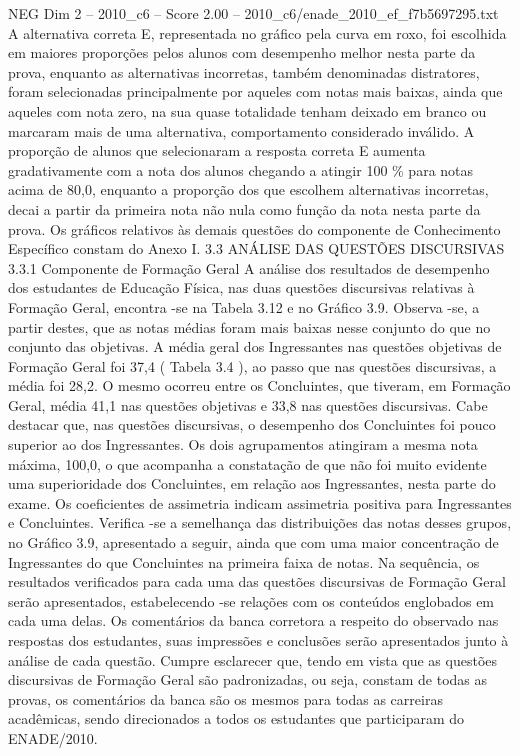 \begin{textsample}{NEG Dim 2 – 2010\_c6 – Score 2.00 – 2010\_c6/enade\_2010\_ef\_f7b5697295.txt}
A alternativa correta E, representada no gráfico pela curva em roxo, foi escolhida em maiores proporções pelos alunos com desempenho melhor nesta parte da prova, enquanto as alternativas incorretas, também denominadas distratores, foram selecionadas principalmente por aqueles com notas mais baixas, ainda que aqueles com nota zero, na sua quase totalidade tenham deixado em branco ou marcaram mais de uma alternativa, comportamento considerado inválido.
A proporção de alunos que selecionaram a resposta correta E aumenta gradativamente com a nota dos alunos chegando a atingir 100 \% para notas acima de 80,0, enquanto a proporção dos que escolhem alternativas incorretas, decai a partir da primeira nota não nula como função da nota nesta parte da prova.
Os gráficos relativos às demais questões do componente de Conhecimento Específico constam do Anexo I. 3.3 ANÁLISE DAS QUESTÕES DISCURSIVAS 3.3.1 Componente de Formação Geral A análise dos resultados de desempenho dos estudantes de Educação Física, nas duas questões discursivas relativas à Formação Geral, encontra -se na Tabela 3.12 e no Gráfico 3.9.
Observa -se, a partir destes, que as notas médias foram mais baixas nesse conjunto do que no conjunto das objetivas.
A média geral dos Ingressantes nas questões objetivas de Formação Geral foi 37,4 ( Tabela 3.4 ), ao passo que nas questões discursivas, a média foi 28,2.
O mesmo ocorreu entre os Concluintes, que tiveram, em Formação Geral, média 41,1 nas questões objetivas e 33,8 nas questões discursivas.
Cabe destacar que, nas questões discursivas, o desempenho dos Concluintes foi pouco superior ao dos Ingressantes.
Os dois agrupamentos atingiram a mesma nota máxima, 100,0, o que acompanha a constatação de que não foi muito evidente uma superioridade dos Concluintes, em relação aos Ingressantes, nesta parte do exame.
Os coeficientes de assimetria indicam assimetria positiva para Ingressantes e Concluintes.
Verifica -se a semelhança das distribuições das notas desses grupos, no Gráfico 3.9, apresentado a seguir, ainda que com uma maior concentração de Ingressantes do que Concluintes na primeira faixa de notas.
Na sequência, os resultados verificados para cada uma das questões discursivas de Formação Geral serão apresentados, estabelecendo -se relações com os conteúdos englobados em cada uma delas.
Os comentários da banca corretora a respeito do observado nas respostas dos estudantes, suas impressões e conclusões serão apresentados junto à análise de cada questão.
Cumpre esclarecer que, tendo em vista que as questões discursivas de Formação Geral são padronizadas, ou seja, constam de todas as provas, os comentários da banca são os mesmos para todas as carreiras acadêmicas, sendo direcionados a todos os estudantes que participaram do ENADE/2010.

\end{textsample}
